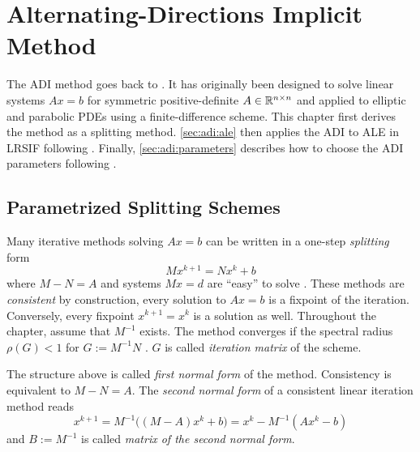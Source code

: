\chapter{Alternating-Directions Implicit Method}
\label{sec:ADI}

The \acf{ADI} method goes back to \cite{Peaceman1955}.
It has originally been designed to solve linear systems
$Ax=b$
for symmetric positive-definite $A\in\mathbb{R}^{n\times n}$
and applied to elliptic and parabolic \acp{PDE} using a finite-difference scheme.
This chapter first derives the method as a splitting method.
\autoref{sec:adi:ale} then applies the \ac{ADI} to \ac{ALE} in \ac{LRSIF} following \cite{Lang2017}.
Finally, \autoref{sec:adi:parameters} describes how to choose the \ac{ADI} parameters following \cite{Kuerschner2016}.

\section{Parametrized Splitting Schemes}

Many iterative methods solving $Ax=b$ can be written in a one-step \emph{splitting} form
\begin{equation}
  Mx^{k+1} = Nx^k + b
\end{equation}
where $M-N = A$ and systems $Mx = d$ are \enquote{easy} to solve \cite[Section~11.2.3]{Golub2013}.
These methods are \emph{consistent} by construction,
\ie every solution to $Ax=b$ is a fixpoint of the iteration.
Conversely, every fixpoint $x^{k+1} = x^k$ is a solution as well.
Throughout the chapter, assume that $M^{-1}$ exists.
The method converges if the spectral radius $\rho(G) < 1$ for $G:=M^{-1}N$ \cite[Theorem~11.2.1]{Golub2013}.
$G$ is called \emph{iteration matrix} of the scheme.

The structure above is called \emph{first normal form} of the method.
Consistency is equivalent to $M-N=A$.
The \emph{second normal form} of a consistent linear iteration method reads
\begin{equation}
  x^{k+1} = M^{-1} \big( (M-A) x^k + b \big) = x^k - M^{-1} (Ax^k - b)
\end{equation}
and $B := M^{-1}$ is called \emph{matrix of the second normal form}.

